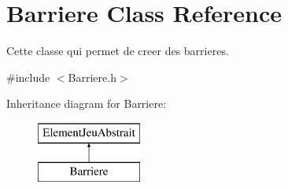 \hypertarget{class_barriere}{\section{Barriere Class Reference}
\label{class_barriere}
}


Cette classe qui permet de creer des barrieres.  




{\ttfamily \#include $<$Barriere.\-h$>$}

Inheritance diagram for Barriere\-:\begin{figure}[H]
\begin{center}
\leavevmode
\includegraphics[height=2.000000cm]{class_barriere}
\end{center}
\end{figure}
